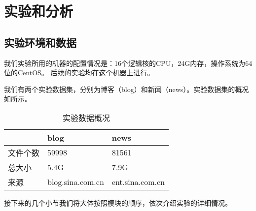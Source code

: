 \section{实验和分析}
\label{sec:result-analysis}

\subsection{实验环境和数据}
\label{sec:dataenv}
我们实验所用的机器的配置情况是：16个逻辑核的CPU，24G内存，操作系统为64位的CentOS。
后续的实验均在这个机器上进行。

我们有两个实验数据集，分别为博客（blog）和新闻（news）。实验数据集的概况
如所示。
\begin{table}[h] 
  \centering
  \caption{实验数据概况}
  \label{experiment:tab:overview}
\begin{tabular}{lll}
  \toprule
 & blog & news \\
\hline
文件个数 & 59998 & 81561 \\
总大小 & 5.4G & 7.9G \\
来源 & blog.sina.com.cn & ent.sina.com.cn \\
\bottomrule
\end{tabular}
\end{table}
\begin{comment}
#+ORGTBL: SEND 实验数据概况 orgtbl-to-latex :splice nil :skip 0
|          | blog             | news            |
|----------+------------------+-----------------|
| 文件个数 | 59998            | 81561           |
| 总大小   | 5.4G             | 7.9G            |
| 来源     | blog.sina.com.cn | ent.sina.com.cn |
\end{comment}

接下来的几个小节我们将大体按照模块的顺序，依次介绍实验的详细情况。
\label{sec:results}
